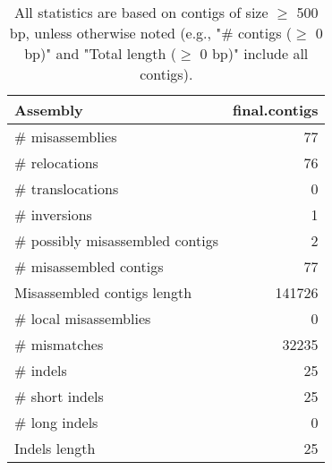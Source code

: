 \documentclass[12pt,a4paper]{article}
\begin{document}
\begin{table}[ht]
\begin{center}
\caption{All statistics are based on contigs of size $\geq$ 500 bp, unless otherwise noted (e.g., "\# contigs ($\geq$ 0 bp)" and "Total length ($\geq$ 0 bp)" include all contigs).}
\begin{tabular}{|l*{1}{|r}|}
\hline
Assembly & final.contigs \\ \hline
\# misassemblies & 77 \\ \hline
\hspace{5mm}\# relocations & 76 \\ \hline
\hspace{5mm}\# translocations & 0 \\ \hline
\hspace{5mm}\# inversions & 1 \\ \hline
\# possibly misassembled contigs & 2 \\ \hline
\# misassembled contigs & 77 \\ \hline
Misassembled contigs length & 141726 \\ \hline
\# local misassemblies & 0 \\ \hline
\# mismatches & 32235 \\ \hline
\# indels & 25 \\ \hline
\hspace{5mm}\# short indels & 25 \\ \hline
\hspace{5mm}\# long indels & 0 \\ \hline
Indels length & 25 \\ \hline
\end{tabular}
\end{center}
\end{table}
\end{document}
